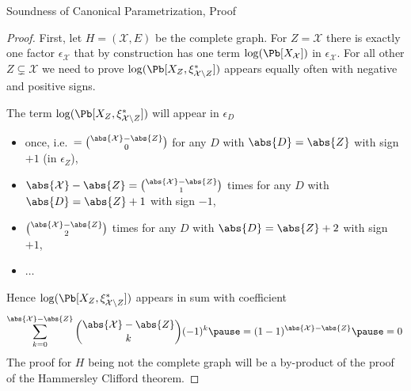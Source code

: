 \begin{frame}{Soundness of Canonical Parametrization, Proof}
\begin{proof}
    First, let $H=(\mathcal{X},E)$ be the complete graph.
\pause
For $Z = \mathcal{X}$ there is exactly one factor $\epsilon_{\mathcal{X}}$ that by construction has one term $\log(\Pb[X_{\mathcal{X}}])$ in $\epsilon_{\mathcal{X}}$.
\pause
For all other $Z \subsetneq \mathcal{X}$ we need to prove $\log(\Pb[X_Z, \xi^*_{\mathcal{X} \backslash Z}])$ appears equally often with negative and positive signs.

\pause 
The term $\log(\Pb[X_Z,\xi^*_{\mathcal{X} \backslash Z}])$ will appear in $\epsilon_D$
\begin{itemize}
\pause \item once, i.e.\ $= \binom{\abs{\mathcal{X}} - \abs{Z}}{0}$ for any $D$ with $\abs{D} = \abs{Z}$ with sign $+1$ (in $\epsilon_Z$),
\pause \item $\abs{\mathcal{X}} - \abs{Z} = \binom{\abs{\mathcal{X}} - \abs{Z}}{1}$ times for any $D$ with $\abs{D} = \abs{Z}+1$ with sign $-1$,
\pause \item $\binom{\abs{\mathcal{X}} - \abs{Z}}{2}$ times for any $D$ with $\abs{D} = \abs{Z}+2$ with sign $+1$,
\pause \item $\ldots$
\end{itemize}
Hence $\log(\Pb[X_Z, \xi^*_{\mathcal{X} \backslash{Z}}])$ appears in sum with coefficient
\begin{equation}
    \sum_{k=0}^{\abs{\mathcal{X}} -\abs{Z}} \binom{\abs{\mathcal{X}} - \abs{Z}}{k} (-1)^k
    \pause = (1 - 1)^{\abs{\mathcal{X}} - \abs{Z}}
    \pause = 0\,
\end{equation}
\pause
The proof for $H$ being not the complete graph will be a by-product of the proof of the Hammersley Clifford theorem.
\end{proof}
\end{frame}

